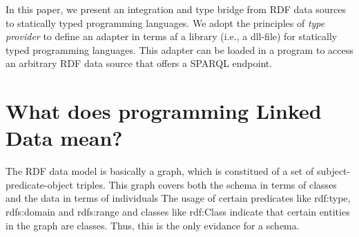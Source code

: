 \documentclass{llncs} %
\begin{document}
%
%
%
%

In this paper, we present an integration and type bridge from RDF data sources to
statically typed programming languages. We adopt the principles of \emph{type provider}
to define an adapter in terms af a library (i.e., a dll-file) for statically typed programming languages. This adapter can
be loaded in a program to access an arbitrary RDF data source that offers a SPARQL endpoint.


\section{What does programming Linked Data mean?}
\label{sec:context}


The RDF data model is basically a graph, which is constitued of a set of subject-predicate-object triples.
This graph covers both the schema in terms of classes and the data in terms of individuals
The usage of certain predicates like \textsf{rdf:type}, \textsf{rdfs:domain} and \textsf{rdfs:range}
and classes like \textsf{rdf:Class} indicate that certain entities in the graph are classes.
Thus, this is the only evidance for a schema.
\end{document}
